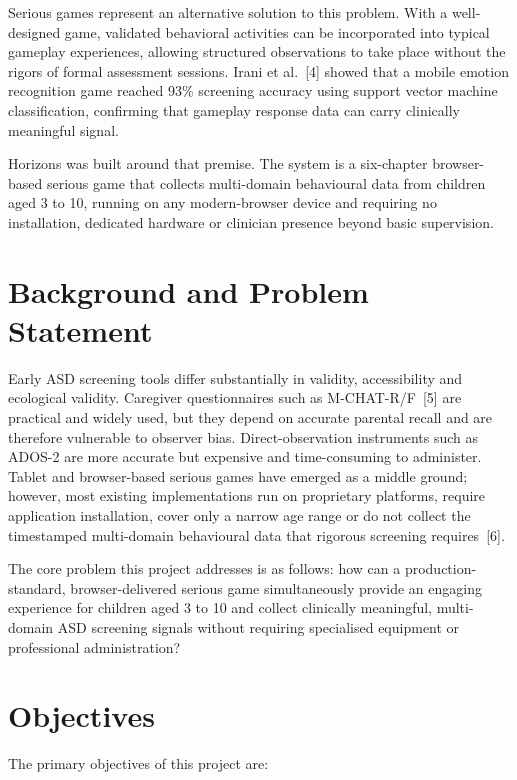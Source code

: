 \documentclass[12pt,a4paper,oneside]{report}
\begin{document}
Serious games represent an alternative solution to this problem. With a well-designed game, validated behavioral activities can be incorporated into typical gameplay experiences, allowing structured observations to take place without the rigors of formal assessment sessions. Irani et al.~[4] showed that a mobile emotion recognition game reached 93\% screening accuracy using support vector machine classification, confirming that gameplay response data can carry clinically meaningful signal.

Horizons was built around that premise. The system is a six-chapter browser-based serious game that collects multi-domain behavioural data from children aged 3 to 10, running on any modern-browser device and requiring no installation, dedicated hardware or clinician presence beyond basic supervision.

\section{Background and Problem Statement}

Early ASD screening tools differ substantially in validity, accessibility and ecological validity. Caregiver questionnaires such as M-CHAT-R/F~[5] are practical and widely used, but they depend on accurate parental recall and are therefore vulnerable to observer bias. Direct-observation instruments such as ADOS-2 are more accurate but expensive and time-consuming to administer. Tablet and browser-based serious games have emerged as a middle ground; however, most existing implementations run on proprietary platforms, require application installation, cover only a narrow age range or do not collect the timestamped multi-domain behavioural data that rigorous screening requires~[6].

The core problem this project addresses is as follows: how can a production-standard, browser-delivered serious game simultaneously provide an engaging experience for children aged 3 to 10 and collect clinically meaningful, multi-domain ASD screening signals without requiring specialised equipment or professional administration?

\section{Objectives}

The primary objectives of this project are:
\end{document}
